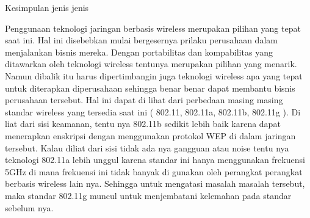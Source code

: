  Kesimpulan jenis jenis
 
Penggunaan teknologi jaringan berbasis wireless merupakan pilihan yang tepat saat ini. Hal ini disebebkan mulai bergesernya prilaku perusahaan dalam menjalankan bisnis mereka. Dengan portabilitas dan kompabilitas yang ditawarkan oleh teknologi wireless tentunya merupakan pilihan yang menarik. Namun dibalik itu harus dipertimbangin juga teknologi wireless apa yang tepat untuk diterapkan diperusahaan sehingga benar benar dapat membantu bisnis perusahaan tersebut. Hal ini dapat di lihat dari perbedaan masing masing standar wireless yang tersedia saat ini ( 802.11, 802.11a, 802.11b, 802.11g ). Di liat dari sisi keamanan, tentu nya 802.11b sedikit lebih baik karena dapat menerapkan enskripsi dengan menggunakan protokol WEP di dalam jaringan tersebut. Kalau diliat dari sisi tidak ada nya gangguan atau noise tentu nya teknologi 802.11a lebih unggul karena standar ini hanya menggunakan frekuensi 5GHz di mana frekuensi ini tidak banyak di gunakan oleh perangkat perangkat berbasis wireless lain nya. Sehingga untuk mengatasi masalah masalah tersebut, maka standar 802.11g muncul untuk menjembatani kelemahan pada standar sebelum nya. 

